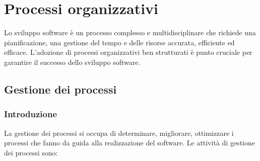 
\section{Processi organizzativi}
Lo sviluppo software è un processo complesso e multidisciplinare che richiede una pianificazione, una gestione del tempo e delle risorse accurata, efficiente ed efficace. L'adozione di processi organizzativi ben strutturati è punto cruciale per garantire il successo dello sviluppo software. 
\subsection{Gestione dei processi}
\subsubsection{Introduzione}
La gestione dei processi si occupa di determinare, migliorare, ottimizzare i processi che fanno da guida alla realizzazione del software. Le attività di gestione dei processi sono:
